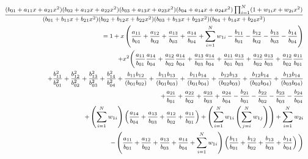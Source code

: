 \documentclass[a4paper,11pt]{article}
\newcommand{\mksmall}[1]{\textnormal{\smaller$#1$}}
\begin{document}
\begin{eqnarray*}
&&
\mksmall{
\frac{(b_{01} + a_{11} x + a_{21} x^2) (b_{02} + a_{12} x + a_{22} x^2) (b_{03} + a_{13} x + a_{23} x^2) (b_{04} + a_{14} x + a_{24} x^2) \prod_{i=1}^N (1 + w_{1i} x +w_{2i} x^2)} {
(b_{01} + b_{11} x + b_{21} x^2 ) (b_{02} + b_{12} x + b_{22} x^2 ) (b_{03} + b_{13} x + b_{23} x^2) (b_{04} + b_{14} x + b_{24} x^2 )}
}
\\&&\quad
\mksmall{
= 1
+ x \left(\frac{a_{11}}{b_{01}} + \frac{a_{12}}{b_{02}} + \frac{a_{13}}{b_{03}} + \frac{a_{14}}{b_{04}} + \sum_{i=1}^N w_{1i}  - \frac{b_{11}}{b_{01}} - \frac{b_{12}}{b_{02}} - \frac{b_{13}}{b_{03}} - \frac{b_{14}}{b_{04}} \right)}
\\&&\quad
\mksmall{
+ x^2 \Bigg(
  \frac{a_{11}}{b_{01}} \frac{a_{14}}{b_{04}} + \frac{a_{12}}{b_{02}} \frac{a_{14}}{b_{04}} + \frac{a_{13}}{b_{03}} \frac{a_{14}}{b_{04}} + \frac{a_{11}}{b_{01}} \frac{a_{13}}{b_{03}} + \frac{a_{12}}{b_{02}} \frac{a_{13}}{b_{03}} + \frac{a_{12}}{b_{02}} \frac{a_{11}}{b_{01}}}
\\&&\quad
\mksmall{
+ \frac{b_{11}^2}{b_{01}^2}
+ \frac{b_{12}^2}{b_{02}^2}
+ \frac{b_{13}^2}{b_{03}^2}
+ \frac{b_{14}^2}{b_{04}^2}
+ \frac{b_{11} b_{12} }{(b_{01} b_{02})}
+ \frac{b_{11} b_{13} }{(b_{01} b_{03})}
+ \frac{b_{11} b_{14} }{(b_{01} b_{04})}
+ \frac{b_{12} b_{13} }{(b_{02} b_{03})}
+ \frac{b_{12} b_{14} }{(b_{02} b_{04})}
+ \frac{b_{13} b_{14} }{(b_{03} b_{04})}}
\\&&\quad
\mksmall{
+ \frac{a_{21}}{b_{01}} + \frac{a_{22}}{b_{02}} + \frac{a_{23}}{b_{03}} + \frac{a_{24}}{b_{04}}
- \frac{b_{21}}{b_{01}}
- \frac{b_{22}}{b_{02} }
- \frac{b_{23}}{b_{03}}
- \frac{b_{24}}{b_{04}}
}
\\&&\quad
\mksmall{
+ \left( \sum_{i=1}^N w_{1i} \right) \left( \frac{a_{14}}{b_{04}} + \frac{a_{13}}{b_{03}} + \frac{a_{12}}{b_{02}} + \frac{a_{11}}{b_{01}} \right)
 + \left(\sum_{i=1}^N w_{1i} \left(\sum_{j=i}^N w_{1j}\right)\right) + \sum_{i=1}^N w_{2i} 
}
\\&&\quad
\mksmall{
-
\left(\frac{a_{11}}{b_{01}} + \frac{a_{12}}{b_{02}} + \frac{a_{13}}{b_{03}} + \frac{a_{14}}{b_{04}} + \sum_{i=1}^N w_{1i} \right)
\left( \frac{b_{11}}{b_{01}} + \frac{b_{12}}{b_{02}} + \frac{b_{13}}{b_{03}} + \frac{b_{14}}{b_{04}} \right)
\Bigg)}
\end{eqnarray*}
\end{document}
